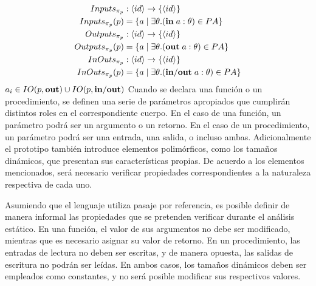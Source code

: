 




\iffalse
\begin{align*}
Inputs_{\pi_{p}} &: \langle id \rangle \rightarrow \{ \langle id \rangle \}
\\
Inputs_{\pi_{p}}(p) &= \{ a \mid \exists \theta. (\mathbf{in} \; a: \theta) \in PA \}
\\
Outputs_{\pi_{p}} &: \langle id \rangle \rightarrow \{ \langle id \rangle \}
\\
Outputs_{\pi_{p}}(p) &= \{ a \mid \exists \theta. (\mathbf{out} \; a: \theta) \in PA \}
\\
InOuts_{\pi_{p}} &: \langle id \rangle \rightarrow \{ \langle id \rangle \}
\\
InOuts_{\pi_{p}}(p) &= \{ a \mid \exists \theta. (\mathbf{in/out} \; a: \theta) \in PA \}
\end{align*}
$a_i \in IO(p, \mathbf{out}) \cup IO(p, \mathbf{in/out})$
Cuando se declara una función o un procedimiento, se definen una serie de parámetros apropiados que cumplirán distintos roles en el correspondiente cuerpo.
En el caso de una función, un parámetro podrá ser un argumento o un retorno.
En el caso de un procedimiento, un parámetro podrá ser una entrada, una salida, o incluso ambas.
Adicionalmente el prototipo también introduce elementos polimórficos, como los tamaños dinámicos, que presentan sus características propias.
De acuerdo a los elementos mencionados, será necesario verificar propiedades correspondientes a la naturaleza respectiva de cada uno.

Asumiendo que el lenguaje utiliza pasaje por referencia, es posible definir de manera informal las propiedades que se pretenden verificar durante el análisis estático.
En una función, el valor de sus argumentos no debe ser modificado, mientras que es necesario asignar su valor de retorno.
En un procedimiento, las entradas de lectura no deben ser escritas, y de manera opuesta, las salidas de escritura no podrán ser leídas.
En ambos casos, los tamaños dinámicos deben ser empleados como constantes, y no será posible modificar sus respectivos valores.
